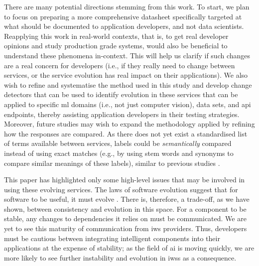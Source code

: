 There are many potential directions stemming from this work. 
To start, we plan to focus on preparing a more comprehensive datasheet specifically targeted at what should be documented to application developers, and not data scientists. 
Reapplying this work in real-world contexts, that is, to get real developer opinions and study production grade systems, would also be beneficial to understand these  phenomena in-context. This will help us clarify if such changes are a real concern for developers (i.e., if they really need to change between services, or the service evolution has real impact on their applications).
We also wish to refine and systematise the method used in this study and develop change detectors that can be used to identify evolution in these services that can be applied to specific \gls{ml} domains (i.e., not just computer vision), data sets, and \gls{api} endpoints, thereby assisting application developers in their testing strategies.
Moreover, future studies may wish to expand the methodology applied by refining how the responses are compared. As there does not yet exist a standardised list of terms available between services, labels could be \textit{semantically} compared instead of using exact matches (e.g., by using stem words and synonyms to compare similar meanings of these labels), similar to previous studies \citep{Ohtake:2019vi}.

This paper has highlighted only some high-level issues that may be involved in using these evolving services. The laws of software evolution suggest that for software to be useful, it must evolve \citep{THOMAS2014457,1572302}. There is, therefore, a trade-off, as we have shown, between consistency and evolution in this space. For a component to be stable, any changes to dependencies it relies on must be communicated. We are yet to see this maturity of communication from \gls{iws} providers. Thus, developers must be cautious between integrating intelligent components into their applications at the expense of stability; as the field of \gls{ai} is moving quickly, we are more likely to see further instability and evolution in \glspl{iws} as a consequence.